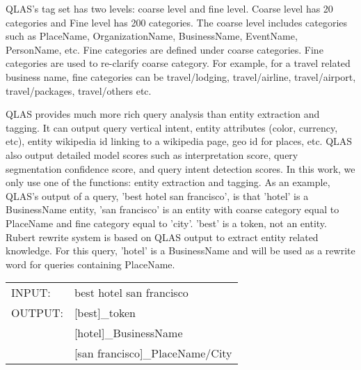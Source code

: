 \documentclass{sig-alternate}
\begin{document}
QLAS's tag set has two levels: coarse level and fine level. Coarse level has 20 categories and Fine level has 200 categories. The coarse level  includes categories such as PlaceName, OrganizationName, BusinessName, EventName, PersonName, etc. Fine categories are defined under  coarse categories. Fine categories are used to re-clarify coarse category. For example, for a travel related business name, fine categories can be  travel/lodging, travel/airline, travel/airport, travel/packages, travel/others etc. 

QLAS provides much more rich query analysis than entity extraction and tagging. It can output query vertical intent, entity attributes (color, currency, etc), entity wikipedia id linking to a wikipedia page,  geo id for places, etc. QLAS also output detailed model scores such as interpretation score, query segmentation confidence score, and query intent detection scores. In this work, we only use  one of the functions: entity extraction and tagging.   As an example, QLAS's output of a query, 'best hotel san francisco', is that 'hotel' is a BusinessName entity, 'san francisco' is an entity with coarse category equal to PlaceName and fine category equal to 'city'. 'best' is a token, not an entity. Rubert rewrite system is based on QLAS output to extract entity related knowledge. For this query, 'hotel' is a BusinessName and will be used as a rewrite word for  queries containing PlaceName. 

\begin{tabular}{ll} \\
INPUT:    &  best hotel san francisco  \\
OUTPUT: & [best]\_token \\
                 & [hotel]\_BusinessName \\
                 & [san francisco]\_PlaceName/City \\
\end{tabular}
\end{document}
